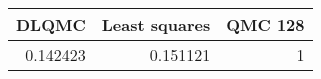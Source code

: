 \begin{tabular}{rrr}
\toprule
    DLQMC &   Least squares &   QMC 128 \\
\midrule
 0.142423 &        0.151121 &         1 \\
\bottomrule
\end{tabular}
